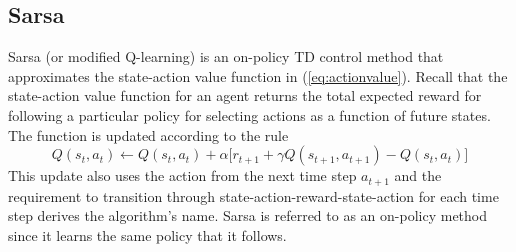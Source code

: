 \subsection{Sarsa}
\label{sec:sarsa}
Sarsa (or modified Q-learning) is an on-policy TD control method that
approximates the state-action value function in (\ref{eq:actionvalue}).
Recall that the state-action value function for an agent returns the total
expected reward for following a particular policy for selecting actions as a
function of future states.  The function is updated according to the rule
\begin{equation}
\label{eq:sarsa}
Q(s_t,a_t) \leftarrow Q(s_t,a_t) + \alpha \bigl[r_{t+1} + \gamma
Q(s_{t+1},a_{t+1}) - Q(s_t,a_t)\bigr]
\end{equation}
This update also uses the action from the next time step $a_{t+1}$ and the
requirement to transition through state-action-reward-state-action for each
time step derives the algorithm's name.  Sarsa is referred to as an on-policy
method since it learns the same policy that it follows.

